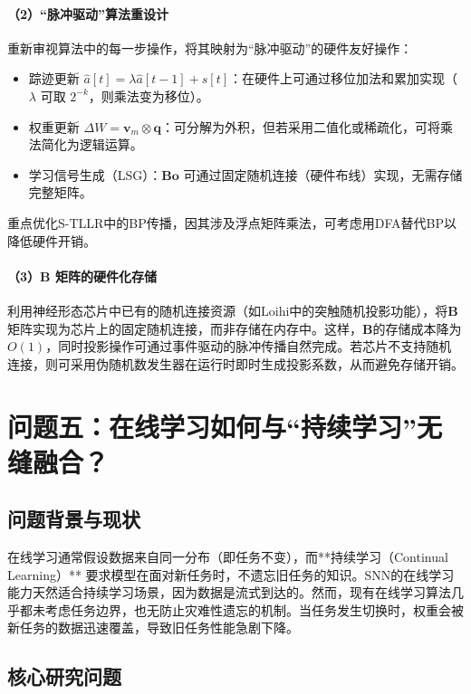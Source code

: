 \documentclass{article}
\begin{document}
\paragraph{（2）“脉冲驱动”算法重设计}
重新审视算法中的每一步操作，将其映射为“脉冲驱动”的硬件友好操作：
\begin{itemize}
    \item 踪迹更新 \(\hat{a}[t] = \lambda \hat{a}[t-1] + s[t]\)：在硬件上可通过移位加法和累加实现（\(\lambda\) 可取 \(2^{-k}\)，则乘法变为移位）。
    \item 权重更新 \(\Delta W = \mathbf{v}_m \otimes \mathbf{q}\)：可分解为外积，但若采用二值化或稀疏化，可将乘法简化为逻辑运算。
    \item 学习信号生成（LSG）：\(\mathbf{B} \mathbf{o}\) 可通过固定随机连接（硬件布线）实现，无需存储完整矩阵。
\end{itemize}
重点优化S-TLLR中的BP传播，因其涉及浮点矩阵乘法，可考虑用DFA替代BP以降低硬件开销。

\paragraph{（3）\(\mathbf{B}\) 矩阵的硬件化存储}
利用神经形态芯片中已有的随机连接资源（如Loihi中的突触随机投影功能），将\(\mathbf{B}\)矩阵实现为芯片上的固定随机连接，而非存储在内存中。这样，\(\mathbf{B}\)的存储成本降为 \(O(1)\)，同时投影操作可通过事件驱动的脉冲传播自然完成。若芯片不支持随机连接，则可采用伪随机数发生器在运行时即时生成投影系数，从而避免存储开销。

\section{问题五：在线学习如何与“持续学习”无缝融合？}

\subsection{问题背景与现状}

在线学习通常假设数据来自同一分布（即任务不变），而**持续学习（Continual Learning）** 要求模型在面对新任务时，不遗忘旧任务的知识。SNN的在线学习能力天然适合持续学习场景，因为数据是流式到达的。然而，现有在线学习算法几乎都未考虑任务边界，也无防止灾难性遗忘的机制。当任务发生切换时，权重会被新任务的数据迅速覆盖，导致旧任务性能急剧下降。

\subsection{核心研究问题}
\end{document}
